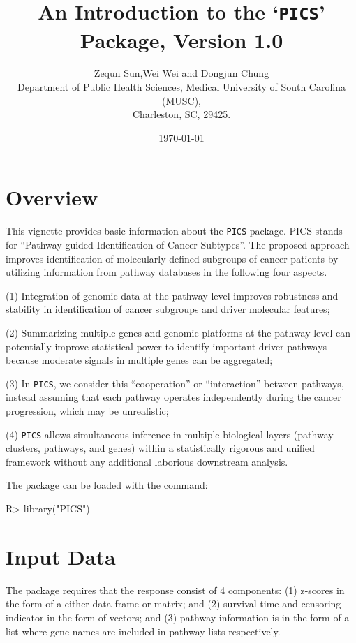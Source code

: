 \documentclass[11pt]{article}
\title{An Introduction to the `\texttt{PICS}' Package, Version 1.0}
\author{ Zequn Sun,Wei Wei and Dongjun Chung\\
Department of Public Health Sciences, Medical University of South Carolina (MUSC),\\
  Charleston, SC, 29425.}
\date{\today}
\begin{document}

\maketitle

\section{Overview}

This vignette provides basic information about the
\texttt{PICS} \cite{PICS} package. PICS stands for ``Pathway-guided Identification of Cancer Subtypes''.
The proposed approach improves identification of molecularly-defined subgroups of cancer patients by utilizing information from pathway databases in the following four aspects.

(1) Integration of genomic data at the pathway-level improves robustness and stability in identification of cancer subgroups and driver molecular features;

(2) Summarizing multiple genes and genomic platforms at the pathway-level can potentially improve statistical power to identify important driver pathways because moderate signals in multiple genes can be aggregated;

(3) In \texttt{PICS}, we consider this ``cooperation'' or ``interaction'' between pathways, instead assuming that each pathway operates independently during the cancer progression, which may be unrealistic;

(4) \texttt{PICS} allows simultaneous inference in multiple biological layers (pathway clusters, pathways, and genes) within a statistically rigorous and unified framework without any additional laborious downstream analysis.

The package can be loaded with the command:


\begin{Schunk}
\begin{Sinput}
R> library("PICS")
\end{Sinput}
\end{Schunk}

\section{Input Data}

The package requires that the response consist of 4 components:
(1) z-scores in the form of a either data frame or matrix; and
(2) survival time and censoring indicator in the form of vectors; and
(3) pathway information is in the form of a list where gene names are included in pathway lists respectively.
\end{document}
